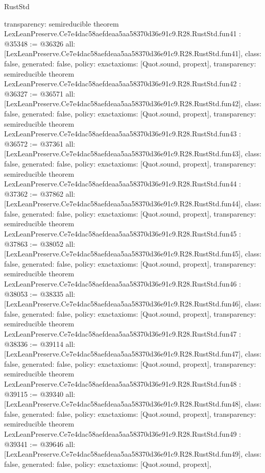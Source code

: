 \begin{lexlean}{RustStd}
\begin{coremodule}
{  transparency: semireducible
}
theorem LexLeanPreserve.Ce7e4dac58aefdeaa5aa58370d36e91c9.R28.RustStd.fun41 : @35348 := @36326 {
  all: [LexLeanPreserve.Ce7e4dac58aefdeaa5aa58370d36e91c9.R28.RustStd.fun41],
  class: false,
  generated: false,
  policy: exact{axioms: [Quot.sound, propext]},
  transparency: semireducible
}
theorem LexLeanPreserve.Ce7e4dac58aefdeaa5aa58370d36e91c9.R28.RustStd.fun42 : @36327 := @36571 {
  all: [LexLeanPreserve.Ce7e4dac58aefdeaa5aa58370d36e91c9.R28.RustStd.fun42],
  class: false,
  generated: false,
  policy: exact{axioms: [Quot.sound, propext]},
  transparency: semireducible
}
theorem LexLeanPreserve.Ce7e4dac58aefdeaa5aa58370d36e91c9.R28.RustStd.fun43 : @36572 := @37361 {
  all: [LexLeanPreserve.Ce7e4dac58aefdeaa5aa58370d36e91c9.R28.RustStd.fun43],
  class: false,
  generated: false,
  policy: exact{axioms: [Quot.sound, propext]},
  transparency: semireducible
}
theorem LexLeanPreserve.Ce7e4dac58aefdeaa5aa58370d36e91c9.R28.RustStd.fun44 : @37362 := @37862 {
  all: [LexLeanPreserve.Ce7e4dac58aefdeaa5aa58370d36e91c9.R28.RustStd.fun44],
  class: false,
  generated: false,
  policy: exact{axioms: [Quot.sound, propext]},
  transparency: semireducible
}
theorem LexLeanPreserve.Ce7e4dac58aefdeaa5aa58370d36e91c9.R28.RustStd.fun45 : @37863 := @38052 {
  all: [LexLeanPreserve.Ce7e4dac58aefdeaa5aa58370d36e91c9.R28.RustStd.fun45],
  class: false,
  generated: false,
  policy: exact{axioms: [Quot.sound, propext]},
  transparency: semireducible
}
theorem LexLeanPreserve.Ce7e4dac58aefdeaa5aa58370d36e91c9.R28.RustStd.fun46 : @38053 := @38335 {
  all: [LexLeanPreserve.Ce7e4dac58aefdeaa5aa58370d36e91c9.R28.RustStd.fun46],
  class: false,
  generated: false,
  policy: exact{axioms: [Quot.sound, propext]},
  transparency: semireducible
}
theorem LexLeanPreserve.Ce7e4dac58aefdeaa5aa58370d36e91c9.R28.RustStd.fun47 : @38336 := @39114 {
  all: [LexLeanPreserve.Ce7e4dac58aefdeaa5aa58370d36e91c9.R28.RustStd.fun47],
  class: false,
  generated: false,
  policy: exact{axioms: [Quot.sound, propext]},
  transparency: semireducible
}
theorem LexLeanPreserve.Ce7e4dac58aefdeaa5aa58370d36e91c9.R28.RustStd.fun48 : @39115 := @39340 {
  all: [LexLeanPreserve.Ce7e4dac58aefdeaa5aa58370d36e91c9.R28.RustStd.fun48],
  class: false,
  generated: false,
  policy: exact{axioms: [Quot.sound, propext]},
  transparency: semireducible
}
theorem LexLeanPreserve.Ce7e4dac58aefdeaa5aa58370d36e91c9.R28.RustStd.fun49 : @39341 := @39646 {
  all: [LexLeanPreserve.Ce7e4dac58aefdeaa5aa58370d36e91c9.R28.RustStd.fun49],
  class: false,
  generated: false,
  policy: exact{axioms: [Quot.sound, propext]},
}
\end{coremodule}
\end{lexlean}
